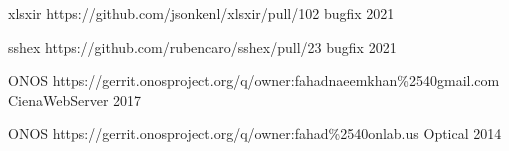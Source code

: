 \begin{cvhonors}
  \cvhonor
    {xlsxir} %
    {https://github.com/jsonkenl/xlsxir/pull/102}
    {bugfix} %
    {2021} %

  \cvhonor
    {sshex} %
    {https://github.com/rubencaro/sshex/pull/23}
    {bugfix} %
    {2021} %

  \cvhonor
    {ONOS} %
    {https://gerrit.onosproject.org/q/owner:fahadnaeemkhan\%2540gmail.com}
    {CienaWebServer} %
    {2017} %

  \cvhonor
    {ONOS} %
    {https://gerrit.onosproject.org/q/owner:fahad\%2540onlab.us}
    {Optical} %
    {2014} %

\end{cvhonors}
